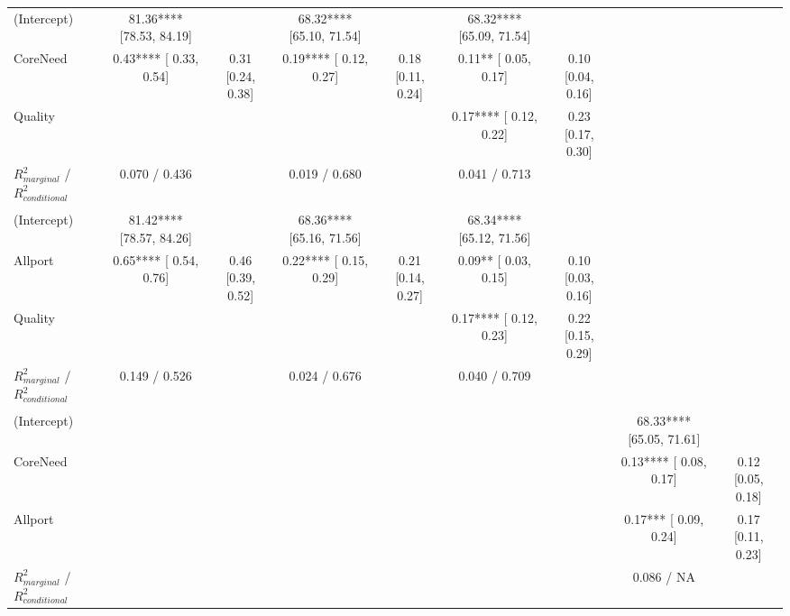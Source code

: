 \begin{landscape}
\begin{table}
\begin{minipage}[t][\textheight][t]{\textwidth}
{\begin{tabular}[t]{lcccccccc}
\hspace{1em}(Intercept) & 81.36**** [78.53, 84.19] &  & 68.32**** [65.10, 71.54] &  & 68.32**** [65.09, 71.54] &  &  & \\
\hspace{1em}CoreNeed & 0.43**** [ 0.33,  0.54] & 0.31 [0.24, 0.38] & 0.19**** [ 0.12,  0.27] & 0.18 [0.11, 0.24] & 0.11** [ 0.05,  0.17] & 0.10 [0.04, 0.16] &  & \\
\hspace{1em}Quality &  &  &  &  & 0.17**** [ 0.12,  0.22] & 0.23 [0.17, 0.30] &  & \\
\hspace{1em}$R^2_{marginal}$ / $R^2_{conditional}$ & 0.070 / 0.436 &  & 0.019 / 0.680 &  & 0.041 / 0.713 &  &  & \\
\addlinespace[0.3em]
\multicolumn{9}{l}{\textbf{Study 3: Allport}}\\
\hspace{1em}(Intercept) & 81.42**** [78.57, 84.26] &  & 68.36**** [65.16, 71.56] &  & 68.34**** [65.12, 71.56] &  &  & \\
\hspace{1em}Allport & 0.65**** [ 0.54,  0.76] & 0.46 [0.39, 0.52] & 0.22**** [ 0.15,  0.29] & 0.21 [0.14, 0.27] & 0.09** [ 0.03,  0.15] & 0.10 [0.03, 0.16] &  & \\
\hspace{1em}Quality &  &  &  &  & 0.17**** [ 0.12,  0.23] & 0.22 [0.15, 0.29] &  & \\
\hspace{1em}$R^2_{marginal}$ / $R^2_{conditional}$ & 0.149 / 0.526 &  & 0.024 / 0.676 &  & 0.040 / 0.709 &  &  & \\
\addlinespace[0.3em]
\multicolumn{9}{l}{\textbf{Study 3: Needs \& Allport}}\\
\hspace{1em}(Intercept) &  &  &  &  &  &  & 68.33**** [65.05, 71.61] & \\
\hspace{1em}CoreNeed &  &  &  &  &  &  & 0.13**** [ 0.08,  0.17] & 0.12 [0.05, 0.18]\\
\hspace{1em}Allport &  &  &  &  &  &  & 0.17*** [ 0.09,  0.24] & 0.17 [0.11, 0.23]\\
\hspace{1em}$R^2_{marginal}$ / $R^2_{conditional}$ &  &  &  &  &  &  & 0.086 / NA & \\
\bottomrule
\end{tabular}}
\end{minipage}
\end{table}
\end{landscape}
